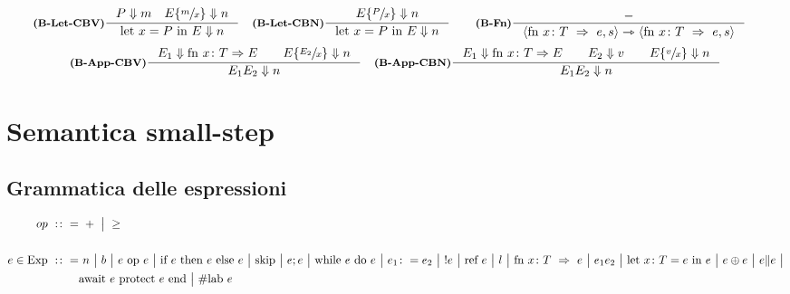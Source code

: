 \documentclass[a4paper, 10pt]{article}
\newcommand{\infer}[4]{\inference[\textbf{#1}]{#2}{#3}#4 }
\newcommand{\bbrule}[2]{ #1 \Downarrow #2}
\newcommand{\srule}[2]{\langle #1 \rangle \rightarrowtriangle \langle #2 \rangle}
\newcommand{\letin}[2]{\text{let } #1 \text{ in } #2}
\newcommand{\subs}[3]{#1 \lbrace \sfrac{#2}{#3} \rbrace}
\begin{document}
	\begin{align*}
		&\infer{(B-Let-CBV)}{\bbrule{P}{m}\quad \bbrule{\subs{E}{m}{x}}{n}}{\bbrule{\letin{x = P}{E}}{n}}{}
		&\infer{(B-Let-CBN)}{\bbrule{\subs{E}{P}{x}}{n}}{\bbrule{\letin{x = P}{E}}{n}}{} \qquad
		&\infer{(B-Fn)}{-}{\srule{\text{fn } x\colon T\ \Rightarrow\ e, s}{\text{fn } x\colon T\ \Rightarrow\ e, s}}{}
	\end{align*}
	\begin{align*}
		&\infer{(B-App-CBV)}{\bbrule{E_1}{\text{fn } x\colon T \Rightarrow E}\qquad \bbrule{\subs{E}{E_2}{x}}{n}}{\bbrule{E_1 E_2}{n}}{}
		&\infer{(B-App-CBN)}{\bbrule{E_1}{\text{fn } x\colon T \Rightarrow E}\qquad \bbrule{E_2}{v}\qquad \bbrule{\subs{E}{v}{x}}{n}}{\bbrule{E_1 E_2}{n}}{}
	\end{align*}

	\newpage
	
\section*{Semantica small-step}
\subsection*{Grammatica delle espressioni}
\begin{minipage}{.45\linewidth}
	\begin{flushleft}
	\begin{align*}
		op\ :\colon =&\ +\ \big|\ \geq \\ \\
		e\in \textup{Exp}\ :\colon =&\ n\ \big|\ b\ \big|\ e\ \textup{op}\ e\ \big|\ \textup{if}\ e\ \textup{then}\ e\ \textup{else}\ e\ \big|\ \textup{skip}\ \big|\ e;e\ \big|\ \textup{while}\ e\ \textup{do}\ e\ \big|\ e_1 \colon = e_2\ \big|\ !e\ \big|\ \text{ref } e\ \big|\ l\ \big|\
		 \text{fn } x\colon T\ \Rightarrow\ e\ \big|\ e_1 e_2\ \big|\  \text{let } x\colon T = e\ \textup{in } e\ \big|\ e\oplus e\ \big|\ e\| e\ \big|\\ 
		 &\textup{await}\ e\ \textup{protect}\ e\ \textup{end}\ \big| \ \# \text{lab } e
	\end{align*}
	\end{flushleft}
\end{minipage}
\end{document}

